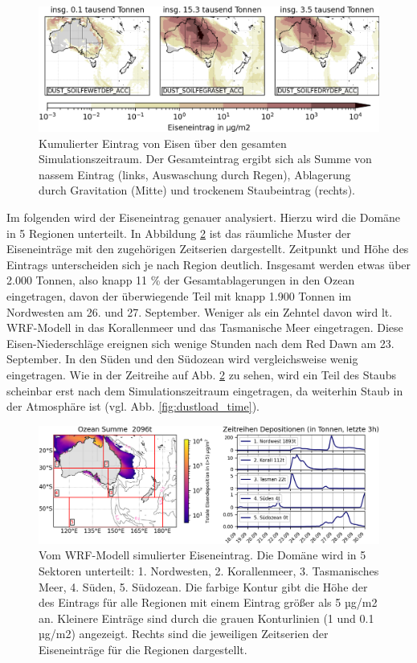 \documentclass[12pt,a4paper,onecolumn]{scrartcl}
\begin{document}
\begin{figure}[!htb]
\includegraphics[width=\textwidth]{bilder/iron_deposition_vars.png}
\caption{Kumulierter Eintrag von Eisen über den gesamten Simulationszeitraum. Der Gesamteintrag ergibt sich als Summe von nassem Eintrag (links, Auswaschung durch Regen), Ablagerung durch Gravitation (Mitte) und trockenem Staubeintrag (rechts).} \label{fig:iron_deposition}
\end{figure}
Im folgenden wird der Eiseneintrag genauer analysiert. Hierzu wird die Domäne in 5 Regionen unterteilt. In Abbildung \ref{fig:iron_deposition_sections} ist das räumliche Muster der Eiseneinträge mit den zugehörigen Zeitserien dargestellt. Zeitpunkt und Höhe des Eintrags unterscheiden sich je nach Region deutlich. Insgesamt werden etwas über 2.000 Tonnen, also knapp 11 \% der Gesamtablagerungen in den Ozean eingetragen, davon der überwiegende Teil mit knapp 1.900 Tonnen im Nordwesten am 26. und 27. September. Weniger als ein Zehntel davon wird lt. WRF-Modell in das Korallenmeer und das Tasmanische Meer eingetragen. Diese Eisen-Niederschläge ereignen sich wenige Stunden nach dem Red Dawn am 23. September. In den Süden und den Südozean wird vergleichsweise wenig eingetragen. Wie in der Zeitreihe auf Abb. \ref{fig:iron_deposition_sections} zu sehen, wird ein Teil des Staubs scheinbar erst nach dem Simulationszeitraum eingetragen, da weiterhin Staub in der Atmosphäre ist (vgl. Abb. \ref{fig:dustload_time}).
\begin{figure}[!htb]
\includegraphics[width=\textwidth]{bilder/total_iron.png}
\caption{Vom WRF-Modell simulierter Eiseneintrag. Die Domäne wird in 5 Sektoren unterteilt: 1. Nordwesten, 2. Korallenmeer, 3. Tasmanisches Meer, 4. Süden, 5. Südozean. Die farbige Kontur gibt die Höhe der des Eintrags für alle Regionen mit einem Eintrag größer als 5 µg/m2 an. Kleinere Einträge sind durch die grauen Konturlinien (1 und 0.1 µg/m2) angezeigt. Rechts sind die jeweiligen Zeitserien der Eiseneinträge für die Regionen dargestellt.} \label{fig:iron_deposition_sections}
\end{figure}
\end{document}
